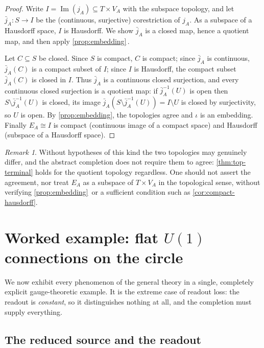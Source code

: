 \documentclass[11pt,reqno]{amsart}
\theoremstyle{plain}
\theoremstyle{definition}
\theoremstyle{remark}
\newtheorem{remark}[theorem]{Remark}
\numberwithin{equation}{section}
\DeclareMathOperator{\Image}{Im}
\begin{document}
\begin{proof}
Write $I=\Image(j_A)\subseteq T\times V_A$ with the subspace topology, and let
$\bar j_A\colon S\to I$ be the (continuous, surjective) corestriction of $j_A$. As a subspace of a
Hausdorff space, $I$ is Hausdorff. We show $\bar j_A$ is a closed map, hence a quotient map, and then
apply \cref{prop:embedding}\,.

Let $C\subseteq S$ be closed. Since $S$ is compact, $C$ is compact; since $\bar j_A$ is continuous,
$\bar j_A(C)$ is a compact subset of $I$; since $I$ is Hausdorff, the compact subset $\bar j_A(C)$ is
closed in $I$. Thus $\bar j_A$ is a continuous closed surjection, and every continuous closed
surjection is a quotient map: if $\bar j_A^{-1}(U)$ is open then $S\setminus\bar j_A^{-1}(U)$ is
closed, its image $\bar j_A(S\setminus\bar j_A^{-1}(U))=I\setminus U$ is closed by surjectivity, so
$U$ is open. By \cref{prop:embedding}, the topologies agree and $\iota$ is an embedding. Finally
$E_A\cong I$ is compact (continuous image of a compact space) and Hausdorff (subspace of a Hausdorff
space).
\end{proof}

\begin{remark}
\label{rem:no-agreement-without-hypotheses}
Without hypotheses of this kind the two topologies may genuinely differ, and the abstract completion
does not require them to agree: \cref{thm:top-terminal} holds for the quotient topology regardless.
One should not assert the agreement, nor treat $E_A$ as a subspace of $T\times V_A$ in the
topological sense, without verifying \cref{prop:embedding}\, or a sufficient
condition such as \cref{cor:compact-hausdorff}.
\end{remark}

\section{Worked example: flat \texorpdfstring{$U(1)$}{U(1)} connections on the circle}
\label{sec:u1}

We now exhibit every phenomenon of the general theory in a single, completely explicit gauge-theoretic
example. It is the extreme case of readout loss: the readout is \emph{constant}, so it distinguishes
nothing at all, and the completion must supply everything.

\subsection{The reduced source and the readout}
\end{document}
